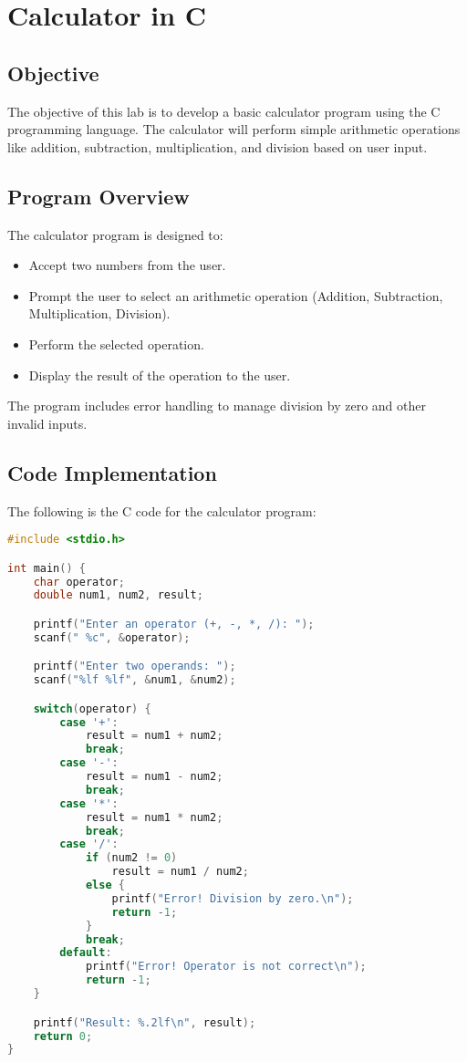 
\section{Calculator in C }

\subsection{Objective}
The objective of this lab is to develop a basic calculator program using the C programming language. The calculator will perform simple arithmetic operations like addition, subtraction, multiplication, and division based on user input.

\subsection{Program Overview}
The calculator program is designed to:
\begin{itemize}
    \item Accept two numbers from the user.
    \item Prompt the user to select an arithmetic operation (Addition, Subtraction, Multiplication, Division).
    \item Perform the selected operation.
    \item Display the result of the operation to the user.
\end{itemize}
The program includes error handling to manage division by zero and other invalid inputs.

\subsection{Code Implementation}
The following is the C code for the calculator program:

\begin{lstlisting}[language=C, caption={Calculator Program in C}, label={lst:calculator}]
#include <stdio.h>

int main() {
    char operator;
    double num1, num2, result;

    printf("Enter an operator (+, -, *, /): ");
    scanf(" %c", &operator);

    printf("Enter two operands: ");
    scanf("%lf %lf", &num1, &num2);

    switch(operator) {
        case '+':
            result = num1 + num2;
            break;
        case '-':
            result = num1 - num2;
            break;
        case '*':
            result = num1 * num2;
            break;
        case '/':
            if (num2 != 0)
                result = num1 / num2;
            else {
                printf("Error! Division by zero.\n");
                return -1;
            }
            break;
        default:
            printf("Error! Operator is not correct\n");
            return -1;
    }

    printf("Result: %.2lf\n", result);
    return 0;
}
\end{lstlisting}





